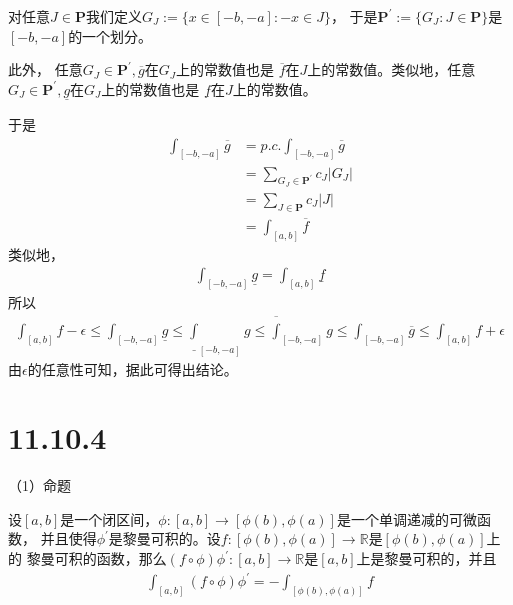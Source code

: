 \documentclass{article}
\begin{document}
对任意$J \in \textbf{P}$我们定义$G_J := \{x \in [-b, -a] : -x \in J\}$，
于是$\textbf{P}^\prime := \{G_J : J \in \textbf{P}\}$是$[-b, -a]$的一个划分。

此外，
任意$G_J \in \textbf{P}^\prime,\overline{g}$在$G_J$上的常数值也是
$\overline{f}$在$J$上的常数值。类似地，任意$G_J \in \textbf{P}^\prime,\underline{g}$在$G_J$上的常数值也是
$\underline{f}$在$J$上的常数值。

于是
\begin{align*}
  \int_{[-b, -a]} \overline{g} & = p.c.\int_{[-b, -a]} \overline{g}                   \\
                               & = \sum \limits_{G_J \in \textbf{P}^\prime} c_J |G_J| \\
                               & = \sum \limits_{J \in \textbf{P}} c_J |J|            \\
                               & = \int_{[a, b]} \overline{f}
\end{align*}
类似地，
\begin{align*}
  \int_{[-b, -a]} \underline{g} = \int_{[a, b]} \underline{f}
\end{align*}
所以
\begin{align*}
  \int_{[a,b]} f - \epsilon
  \leq \int_{[-b, -a]} \underline{g}
  \leq \underline{\int}_{[-b, -a]} g \leq \overline{\int}_{[-b, -a]} g
  \leq \int_{[-b, -a]} \overline{g}
  \leq \int_{[a,b]} f + \epsilon
\end{align*}
由$\epsilon$的任意性可知，据此可得出结论。

\section*{11.10.4}
（1）命题

设$[a, b]$是一个闭区间，$\phi : [a, b] \to [\phi(b), \phi(a)]$是一个单调递减的可微函数，
并且使得$\phi ^\prime$是黎曼可积的。设$f: [\phi(b), \phi(a)] \to \mathbb{R}$是$[\phi(b), \phi(a)]$上的
黎曼可积的函数，那么$(f \circ \phi)\phi^\prime : [a, b] \to \mathbb{R}$是$[a, b]$上是黎曼可积的，并且
\begin{align*}
  \int_{[a, b]} (f \circ \phi) \phi^\prime = - \int_{[\phi(b), \phi(a)]} f
\end{align*}




\end{document}
